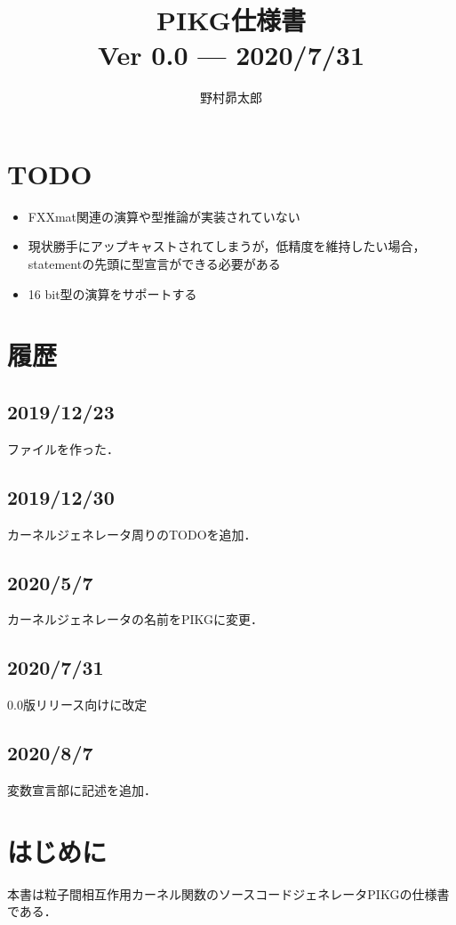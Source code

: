 \documentclass{article}
\begin{document}
%
\title{PIKG仕様書\\
{\large 
Ver 0.0 --- 2020/7/31\\
}
}
\author{野村昴太郎}
\maketitle
\thispagestyle{empty}

\newpage
\tableofcontents
\newpage

\section{TODO}
 \begin{itemize}
  \item FXXmat関連の演算や型推論が実装されていない
  \item 現状勝手にアップキャストされてしまうが，低精度を維持したい場合，statementの先頭に型宣言ができる必要がある
  \item 16 bit型の演算をサポートする
 \end{itemize}
\section{履歴}
\label{sect:4}
\subsection{2019/12/23}
ファイルを作った．
\subsection{2019/12/30}
カーネルジェネレータ周りのTODOを追加．
\subsection{2020/5/7}
カーネルジェネレータの名前をPIKGに変更．
\subsection{2020/7/31}
0.0版リリース向けに改定
\subsection{2020/8/7}
変数宣言部に記述を追加．

\section{はじめに}
本書は粒子間相互作用カーネル関数のソースコードジェネレータPIKGの仕様書である．
\end{document}
